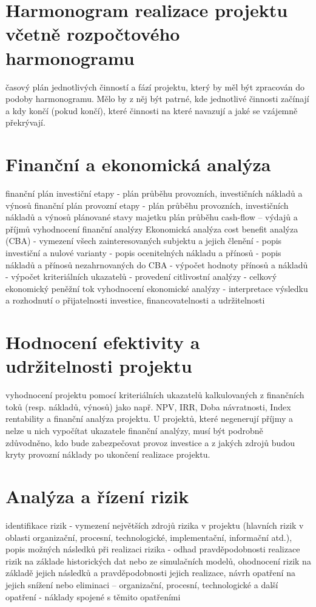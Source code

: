 \documentclass[
	12pt, oneside, printed, final, 
	table,   %
	lof,     %
	lot     %
]{fithesis3}
\begin{document}
{\section{Harmonogram realizace projektu včetně rozpočtového harmonogramu}

časový plán jednotlivých činností a fází projektu, který by měl být zpracován do
podoby harmonogramu. Mělo by z něj být patrné, kde jednotlivé činnosti začínají a
kdy končí (pokud končí), které činnosti na které navazují a jaké se vzájemně
překrývají.

\section{Finanční a ekonomická analýza }

finanční plán investiční etapy
- plán průběhu provozních, investičních nákladů a výnosů
finanční plán provozní etapy
- plán průběhu provozních, investičních nákladů a výnosů
plánované stavy majetku
plán průběhu cash-flow – výdajů a příjmů
vyhodnocení finanční analýzy
Ekonomická analýza
cost benefit analýza (CBA)
- vymezení všech zainteresovaných subjektu a jejich členění
- popis investiční a nulové varianty
- popis ocenitelných nákladu a přínosů
- popis nákladů a přínosů nezahrnovaných do CBA
- výpočet hodnoty přínosů a nákladů
- výpočet kriteriálních ukazatelů
- provedení citlivostní analýzy
- celkový ekonomický peněžní tok
vyhodnocení ekonomické analýzy
- interpretace výsledku a rozhodnutí o přijatelnosti investice,
financovatelnosti a udržitelnosti

\section{Hodnocení efektivity a udržitelnosti projektu}

vyhodnocení projektu pomocí kriteriálních ukazatelů kalkulovaných z finančních toků
(resp. nákladů, výnosů) jako např. NPV, IRR, Doba návratnosti, Index rentability a
finanční analýza projektu. U projektů, které negenerují příjmy a nelze u nich vypočítat
ukazatele finanční analýzy, musí být podrobně zdůvodněno, kdo bude zabezpečovat 
provoz investice a z jakých zdrojů budou kryty provozní náklady po ukončení
realizace projektu.

\section{Analýza a řízení rizik}

identifikace rizik - vymezení největších zdrojů rizika v projektu (hlavních rizik v
oblasti organizační, procesní, technologické, implementační, informační atd.),
popis možných následků při realizaci rizika
- odhad pravděpodobnosti realizace rizik na základe historických dat nebo ze
simulačních modelů, ohodnocení rizik na základě jejich následků a pravděpodobnosti
jejich realizace, návrh opatření na jejich snížení nebo eliminaci – organizační,
procesní, technologické a další opatření
- náklady spojené s těmito opatřeními

}
\end{document}
